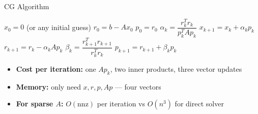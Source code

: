 \documentclass[aspectratio=169]{beamer}
\begin{document}
\begin{frame}{CG Algorithm}
    {\scriptsize
    \begin{algorithm}[H]
        \caption{Conjugate Gradient (Hestenes \& Stiefel, 1952)}
        \begin{algorithmic}[1]
            \State $x_0 = 0$ (or any initial guess)
            \State $r_0 = b - A x_0$
            \State $p_0 = r_0$
                \State $\alpha_k = \dfrac{r_k^T r_k}{p_k^T A p_k}$
                \State $x_{k+1} = x_k + \alpha_k p_k$
                \State $r_{k+1} = r_k - \alpha_k A p_k$
                \State $\beta_k = \dfrac{r_{k+1}^T r_{k+1}}{r_k^T r_k}$
                \State $p_{k+1} = r_{k+1} + \beta_k p_k$
            \EndFor
        \end{algorithmic}
    \end{algorithm}
    }

    \vspace{0.10cm}
    \begin{itemize}
        \item \textbf{Cost per iteration:} one $A p_k$, two inner products, three vector updates
        \item \textbf{Memory:} only need $x, r, p, Ap$ --- four vectors
        \item \textbf{For sparse $A$:} $O(\text{nnz})$ per iteration vs $O(n^3)$ for direct solver
    \end{itemize}
\end{frame}
\end{document}
